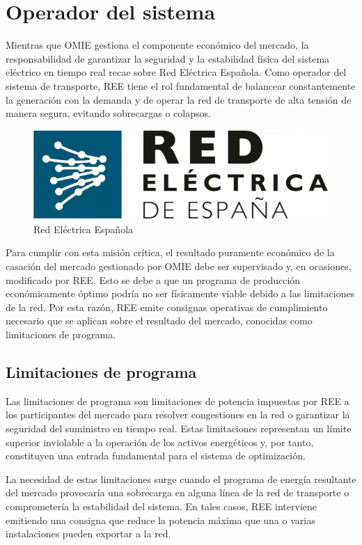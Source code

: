 \section{Operador del sistema}
\label{makereference4.2}

Mientras que OMIE gestiona el componente económico del mercado, la responsabilidad de garantizar la seguridad y la estabilidad física del sistema eléctrico en tiempo real recae sobre Red Eléctrica Española. Como operador del sistema de transporte, REE tiene el rol fundamental de balancear constantemente la generación con la demanda y de operar la red de transporte de alta tensión de manera segura, evitando sobrecargas o colapsos.

\begin{figure}
\centering
\includegraphics[width=0.5\linewidth]{figures/ree.jpg}
\caption{Red Eléctrica Española}
\label{fig:ree}
\end{figure}

Para cumplir con esta misión crítica, el resultado puramente económico de la casación del mercado gestionado por OMIE debe ser supervisado y, en ocasiones, modificado por REE. Esto se debe a que un programa de producción económicamente óptimo podría no ser físicamente viable debido a las limitaciones de la red. Por esta razón, REE emite consignas operativas de cumplimiento necesario que se aplican sobre el resultado del mercado, conocidas como limitaciones de programa.

\subsection{Limitaciones de programa}
\label{makereference4.2.1}

Las limitaciones de programa son limitaciones de potencia impuestas por REE a los participantes del mercado para resolver congestiones en la red o garantizar la seguridad del suministro en tiempo real. Estas limitaciones representan un límite superior inviolable a la operación de los activos energéticos y, por tanto, constituyen una entrada fundamental para el sistema de optimización.

La necesidad de estas limitaciones surge cuando el programa de energía resultante del mercado provocaría una sobrecarga en alguna línea de la red de transporte o comprometería la estabilidad del sistema. En tales casos, REE interviene emitiendo una consigna que reduce la potencia máxima que una o varias instalaciones pueden exportar a la red.

